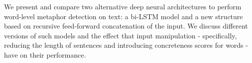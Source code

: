 We present and compare two alternative deep neural architectures to perform word-level metaphor detection on text: a bi-LSTM model and a new structure based on recursive feed-forward concatenation of the input. We discuss different versions of such models and the effect that input manipulation - specifically, reducing the length of sentences and introducing concreteness scores for words - have on their performance.
